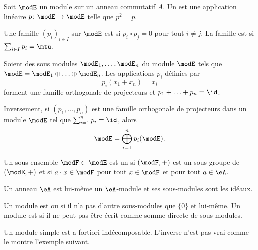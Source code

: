 \begin{definition}
    Soit \( \modE\) un module sur un anneau commutatif \( A\). Un  est une application linéaire \( p\colon \modE\to \modE\) telle que \( p^2=p\).

    Une famille \( (p_i)_{i\in I}\) sur \( \modE\) est  si \( p_i\circ p_j=0\) pour tout \( i\neq j\). La famille est  si \( \sum_{i\in I}p_i=\mtu\).
\end{definition}

\begin{theorem}     \label{ThoProjModpAlsUR}
    Soient des sous modules \( \modE_1,\ldots,\modE_n\) du module \( \modE\) tels que \( \modE=\modE_1\oplus\ldots\oplus\modE_n\). Les applications \( p_i\) définies par
    \begin{equation}
        p_i(x_1+x_n)=x_i
    \end{equation}
    forment une famille orthogonale de projecteurs et \( p_1+\ldots +p_n=\id\).

    Inversement, si \( (p_1,\ldots, p_n)\) est une famille orthogonale de projecteurs dans un module \( \modE\) tel que \( \sum_{i=1}^np_i=\id\), alors
    \begin{equation}
        \modE=\bigoplus_{i=1}^np_i(\modE).
    \end{equation}
\end{theorem}

Un sous-ensemble \( \modF\subset\modE\) est un  si \( (\modF,+)\) est un sous-groupe de \( (\modE,+)\) et si \( a\cdot x\in \modF\) pour tout \( x\in \modF\) et pour tout \( a\in \eA\).

\begin{example}
    Un anneau \( \eA\) est lui-même un \( \eA\)-module et ses sous-modules sont les idéaux.
\end{example}

Un module est  ou  si il n'a pas d'autre sous-modules que \( \{ 0 \}\) et lui-même. Un module est  si il ne peut pas être écrit comme somme directe de sous-modules.

Un module simple est a fortiori indécomposable. L'inverse n'est pas vrai comme le montre l'exemple suivant.

